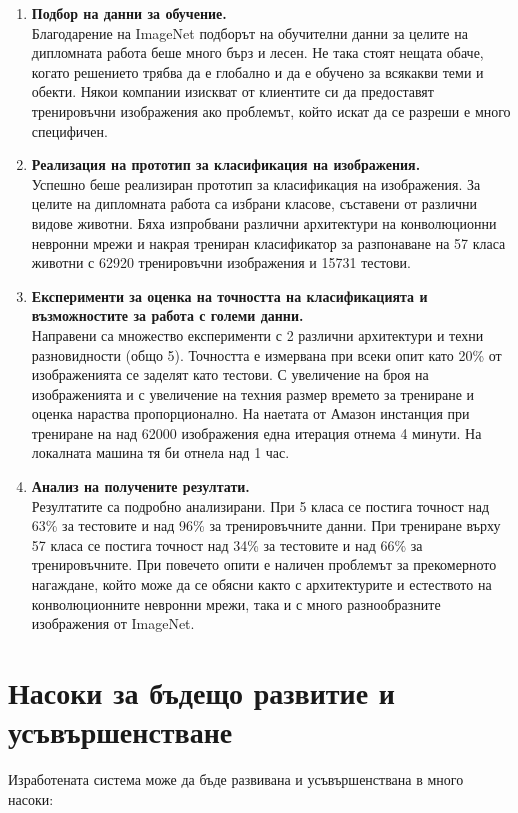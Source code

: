 \begin{enumerate}
\item \textbf{Подбор на данни за обучение.}\\
Благодарение на ImageNet подборът на обучителни данни за целите на дипломната работа беше много бърз и лесен. Не така стоят нещата обаче, когато решението трябва да е глобално и да е обучено за всякакви теми и обекти. Някои компании изискват от клиентите си да предоставят тренировъчни изображения ако проблемът, който искат да се разреши е много специфичен.

\item \textbf{Реализация на прототип за класификация на изображения.}\\
Успешно беше реализиран прототип за класификация на изображения. За целите на дипломната работа са избрани класове, съставени от различни видове животни. Бяха изпробвани различни архитектури на конволюционни невронни мрежи и накрая трениран класификатор за разпонаване на 57 класа животни с 62920 тренировъчни изображения и 15731 тестови.

\item \textbf{Експерименти за оценка на точността на класификацията и възможностите за работа с големи данни.}\\
Направени са множество експерименти с 2 различни архитектури и техни разновидности (общо 5). Точността е измервана при всеки опит като 20\% от изображенията се заделят като тестови. С увеличение на броя на изображенията и с увеличение на техния размер времето за трениране и оценка нараства пропорционално. На наетата от Амазон инстанция при трениране на над 62000 изображения една итерация отнема 4 минути. На локалната машина тя би отнела над 1 час.

\item \textbf{Анализ на получените резултати.}\\
Резултатите са подробно анализирани. При 5 класа се постига точност над 63\% за тестовите и над 96\% за тренировъчните данни. При трениране върху 57 класа се постига точност над 34\% за тестовите и над 66\% за тренировъчните. При повечето опити е наличен проблемът за прекомерното нагаждане, който може да се обясни както с архитектурите и естеството на конволюционните невронни мрежи, така и с много разнообразните изображения от ImageNet.
\end{enumerate}

\section{Насоки за бъдещо развитие и усъвършенстване}
Изработената система може да бъде развивана и усъвършенствана в много насоки:

